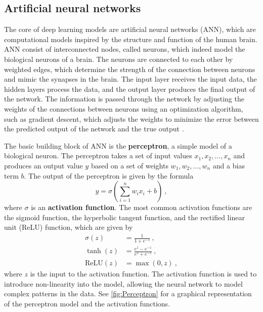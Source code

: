 \subsection{\label{sec:Artificial neural networks} Artificial neural networks}

The core of deep learning models are artificial neural networks (ANN), which
are computational models inspired by the structure and function of the human
brain. ANN consist of interconnected nodes, called neurons, which indeed model
the biological neurons of a brain. The neurons are connected to each other by
weighted edges, which determine the strength of the connection between neurons
and mimic the synapses in the brain. The input layer receives the input data,
the hidden layers process the data, and the output layer produces the final
output of the network. The information is passed through the network by
adjusting the weights of the connections between neurons using an optimization
algorithm, such as gradient descent, which adjusts the weights to minimize the
error between the predicted output of the network and the true output
\cite{Goodfellow2016}.

The basic building block of ANN is the \textbf{perceptron}, a simple model of a
biological neuron. The perceptron takes a set of input values $x_1, x_2,
  \ldots, x_n$ and produces an output value $y$ based on a set of weights $w_1,
  w_2, \ldots, w_n$ and a bias term $b$. The output of the perceptron is given
by the formula
\begin{equation}
  y = \sigma(\sum_{i=1}^n w_ix_i + b) \ ,
\end{equation}
where $\sigma$ is an \textbf{activation function}. The most common activation
functions are the sigmoid function, the hyperbolic tangent function, and the
rectified linear unit (ReLU) function, which are given by
\begin{align}
  \sigma(z)      & = \frac{1}{1 + e^{-z}} \ ,              \\
  \tanh(z)       & = \frac{e^z - e^{-z}}{e^z + e^{-z}} \ , \\
  \text{ReLU}(z) & = \max(0, z) \ ,
\end{align}
where $z$ is the input to the activation function. The activation function is
used to introduce non-linearity into the model, allowing the neural network to
model complex patterns in the data. See \cref{fig:Perceptron} for a graphical
representation of the perceptron model and the activation functions.

